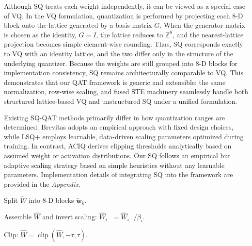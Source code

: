 \documentclass{article}
\theoremstyle{definition}
\theoremstyle{remark}
\begin{document}
Although SQ treats each weight independently, it can be viewed as a special case of VQ. In the VQ formulation, quantization is performed by projecting each 8-D block onto the lattice generated by a basis matrix $G$. When the generator matrix is chosen as the identity, $G=I$, the lattice reduces to $\mathbb{Z}^8$, and the nearest-lattice projection becomes simple element-wise rounding. Thus, SQ corresponds exactly to VQ with an identity lattice, and the two differ only in the structure of the underlying quantizer. Because the weights are still grouped into 8-D blocks for implementation consistency, SQ remains architecturally comparable to VQ. This demonstrates that our QAT framework is generic and extensible: the same normalization, row-wise scaling, and fused STE machinery seamlessly handle both structured lattice-based VQ and unstructured SQ under a unified formulation. 

Existing SQ-QAT methods primarily differ in how quantization ranges are determined. Brevitas \cite{brevitas} adopts an empirical approach with fixed design choices, while LSQ+ \cite{lsq+} employs learnable, data-driven scaling parameters optimized during training. In contrast, ACIQ \cite{banner2018aciq} derives clipping thresholds analytically based on assumed weight or activation distributions. Our SQ follows an empirical but adaptive scaling strategy based on simple heuristics without any learnable parameters. Implementation details of integrating SQ into the framework are provided in the \emph{Appendix}.


\begin{algorithm}[H]
\caption{Scalar quantization}
\label{alg:fused-sq-hnlq}
\scriptsize
\DontPrintSemicolon
{}


Split $\widetilde{W}$ into 8-D blocks $\widetilde{\mathbf{w}}_k$.


Assemble $\widehat{W}$ and invert scaling:
$\widehat{W}_{i,:} = \widehat{W}_{i,:}/\beta_i$.

Clip: $\widehat{W}=\operatorname{clip}(\widehat{W},-\tau,\tau)$.
\end{algorithm}
\end{document}
